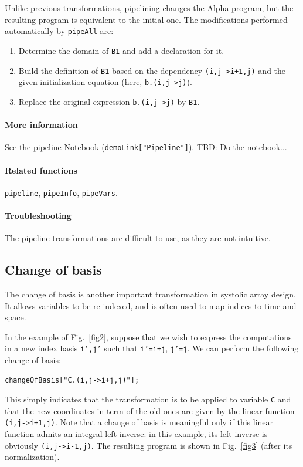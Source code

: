 \documentclass[12pt]{article}
\newcommand{\Alpha}{{\sc Alpha}}
\begin{document}
Unlike previous transformations, pipelining changes the
{\Alpha} program, but the resulting program is equivalent to
the initial one. 
The modifications performed automatically by \texttt{pipeAll} are:
\begin{enumerate}
\item Determine the domain of {\tt B1} and add a
declaration for it.
\item Build the definition of {\tt B1} based on the dependency {\tt (i,j->i+1,j)} and the given initialization equation (here, {\tt b.(i,j->j)}).
\item Replace the original expression {\tt b.(i,j->j)} by {\tt B1}.
\end{enumerate}

\begin{tobedone}
\paragraph*{More information}
See the pipeline Notebook (\texttt{demoLink["Pipeline"]}).
TBD: Do the notebook...
\end{tobedone}

\paragraph*{Related functions}
\texttt{pipeline}, \texttt{pipeInfo}, \texttt{pipeVars}.

\paragraph*{Troubleshooting}
The pipeline transformations are difficult to use, as
they are not intuitive.

\subsection{Change of basis}
\label{cob}
The change of basis is another important transformation in systolic
array design. It allows variables to be re-indexed, and is often used
to map indices to time and space.

In the example of Fig.~\ref{fig2}, suppose that we wish to express
the computations in a new index basis {\tt i',j'} such that {\tt i'=i+j}, 
{\tt j'=j}. We can perform the following change of basis:
\begin{verbatim}
changeOfBasis["C.(i,j->i+j,j)"];
\end{verbatim}
This simply
indicates that the transformation is to be applied to variable {\tt C}
and that the new coordinates in term of the old ones are given by
the linear function \texttt{(i,j->i+1,j)}.
Note that a change of basis is meaningful only if
this linear function admits an integral left inverse: in this
example, its left inverse is obviously \texttt{(i,j->i-1,j)}. The
resulting program is shown in Fig.~\ref{fig3} (after its normalization).
\end{document}

